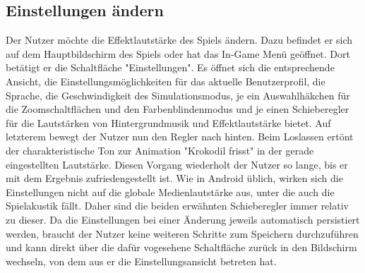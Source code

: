 \subsection{Einstellungen ändern}
Der Nutzer möchte die Effektlautstärke des Spiels ändern. Dazu befindet
er sich auf dem Hauptbildschirm des Spiels oder hat das In-Game Menü 
geöffnet. Dort betätigt er die Schaltfläche "Einstellungen".
Es öffnet sich die entsprechende Ansicht, die Einstellungsmöglichkeiten
für das aktuelle Benutzerprofil, die Sprache, die Geschwindigkeit des Simulationsmodus, je
ein Auswahlhäkchen für die Zoomschaltflächen und den Farbenblindenmodus und je einen Schieberegler
für die Lautstärken von Hintergrundmusik und Effektlautstärke bietet.
Auf letzterem bewegt der Nutzer nun den Regler nach hinten. Beim Loslassen
ertönt der charakteristische Ton zur Animation "Krokodil frisst" in der
gerade eingestellten Lautstärke. Diesen Vorgang wiederholt der Nutzer
so lange, bis er mit dem Ergebnis zufriedengestellt ist. Wie in Android 
üblich, wirken sich die Einstellungen nicht auf die globale Medienlautstärke
aus, unter die auch die Spielakustik fällt. Daher sind die beiden erwähnten
Schieberegler immer relativ zu dieser. Da die Einstellungen
bei einer Änderung jeweils automatisch persistiert werden, braucht der
Nutzer keine weiteren Schritte zum Speichern durchzuführen und kann
direkt über die dafür vogesehene Schaltfläche zurück in den Bildschirm
wechseln, von dem aus er die Einstellungsansicht betreten hat.

